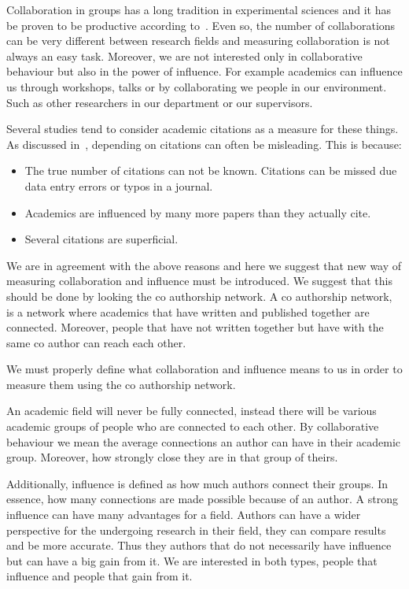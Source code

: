 \documentclass{article}
\theoremstyle{definition}
\begin{document}
Collaboration in groups has a long tradition in experimental sciences and it has
be proven to be productive according to~\cite{Etzkowitz1992}. Even so, the number of collaborations
can be very different between research fields and measuring collaboration is
not always an easy task. Moreover, we are not interested only in collaborative
behaviour but also in the power of influence. For example academics can influence
us through workshops, talks or by collaborating we people in our environment.
Such as other researchers in our department or our supervisors.

Several studies tend to consider academic citations as a measure for these things.
As discussed in~\cite{nature_blog}, depending on citations can often be misleading.
This is because:

\begin{itemize}
    \item The true number of citations can not be known. Citations can be missed
    due data entry errors or typos in a journal.
    \item Academics are influenced by many more papers than they actually cite.
    \item Several citations are superficial.
\end{itemize}

We are in agreement with the above reasons and here we suggest that new way of
measuring collaboration and influence must be introduced. We suggest that this
should be done by looking the co authorship network. A co authorship network,
is a network where academics that have written and published together are connected.
Moreover, people that have not written together but have with the same co author
can reach each other.

We must properly define what collaboration and influence means to us in order to
measure them using the co authorship network.

An academic field will never be fully connected, instead there will be various
academic groups of people who are connected to each other. By collaborative
behaviour we mean the average connections an author can have in their academic
group. Moreover, how strongly close they are in that group of theirs.

Additionally, influence is defined as how much authors connect their groups.
In essence, how many connections are made possible because of an author. A strong
influence can have many advantages for a field. Authors can have a wider perspective
for the undergoing research in their field, they can compare results and be more
accurate. Thus they authors that do not necessarily have influence but can
have a big gain from it. We are interested in both types, people that influence
and people that gain from it.
\end{document}
